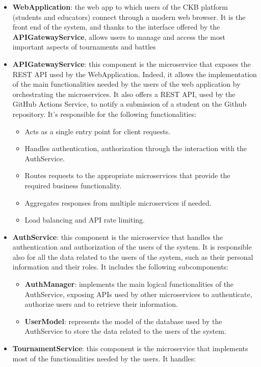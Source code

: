 \begin{itemize}
    \item \textbf{WebApplication}: the web app to which users of the CKB platform (students and educators) connect through a modern web browser. It is the front end of the system, and thanks to the interface offered by the \textbf{APIGatewayService}, allows users to manage and access the most important aspects of tournaments and battles
    \item \textbf{APIGatewayService}: this component is the microservice that exposes the REST API used by the WebApplication. Indeed, it allows the implementation of the main functionalities needed by the users of the web application by orchestrating the microservices. It also offers a REST API, used by the GitHub Actions Service, to notify a submission of a student on the Github repository.
    It's responsible for the following functionalities:
    \begin{itemize}
        \item Acts as a single entry point for client requests.
        \item Handles authentication, authorization through the interaction with the AuthService.
        \item Routes requests to the appropriate microservices that provide the required business functionality.
        \item Aggregates responses from multiple microservices if needed.
        \item Load balancing and API rate limiting.
    \end{itemize}
    \item \textbf{AuthService}: this component is the microservice that handles the authentication and authorization of the users of the system. It is responsible also for all the data related to the users of the system, such as their personal information and their roles. It includes the following subcomponents:
    \begin{itemize}
        \item \textbf{AuthManager}: implements the main logical functionalities of the AuthService, exposing APIs used by other microservices to authenticate, authorize users and to retrieve their information.
        \item \textbf{UserModel}: represents the model of the database used by the AuthService to store the data related to the users of the system.
    \end{itemize}
    \item \textbf{TournamentService}: this component is the microservice that implements most of the functionalities needed by the users. It handles:

\end{itemize}
